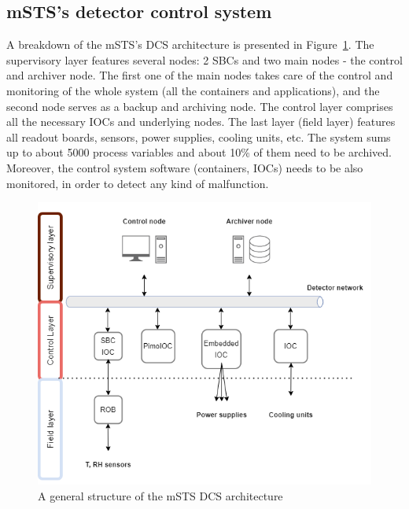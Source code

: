 \subsection{mSTS's detector control system}
A breakdown of the \gls{mSTS}'s \gls{DCS} architecture is presented in Figure~\ref{fig_mstsarch}. The supervisory layer features several nodes: 2 \gls{SBC}s and two main nodes - the control and archiver node. The first one of the main nodes takes care of the control and monitoring of the whole system (all the containers and applications), and the second node serves as a backup and archiving node. The control layer comprises all the necessary \gls{IOC}s and underlying nodes. The last layer (field layer) features all readout boards, sensors, power supplies, cooling units, etc. The system sums up to about 5000 process variables and about 10\% of them need to be archived. Moreover, the control system software (containers, \gls{IOC}s) needs to be also monitored, in order to detect any kind of malfunction. 

\begin{figure}[!h]
\centering
\includegraphics[width=0.55\columnwidth]{Chapter3/DCS/images/mcbmpng.png}
\caption{A general structure of the \gls{mSTS} DCS architecture}
\label{fig_mstsarch}
\end{figure}


